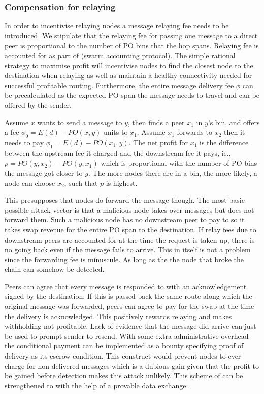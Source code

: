 \subsubsection{Compensation for relaying}

In order to incentivise relaying nodes a message relaying fee needs to be introduced.  We stipulate that the relaying fee for passing one message to a direct peer is proportional to the number of PO bins that the hop spans. Relaying fee is accounted for as part of  (swarm accounting protocol). The simple rational strategy to maximise profit will incentivise nodes to find the closest node to the destination when relaying as well as maintain a healthy connectivity needed for successful profitable routing. Furthermore, the entire message delivery fee $\phi$ can be precalculated as the expected PO span the message needs to travel and can be offered by the sender. 

Assume $x$ wants to send a message to $y$, then finds a peer $x_1$ in $y$'s bin, and offers a fee
$\phi_0 = E(d)-\mathit{PO}(x, y)$ units to $x_1$. Assume $x_1$ forwards to $x_2$ then it needs to pay $\phi_1=E(d)-\mathit{PO}(x_1, y)$. The net profit for $x_1$ is the difference between the upstream fee it charged and  the downstream fee it pays, ie., $p=\mathit{PO}(y, x_2)-\mathit{PO}(y, x_1)$ which is proportional with the number of PO bins the message got closer to $y$. The more nodes there are in a bin, the more likely, a node can choose $x_2$, such that  $p$ is highest.       

This presupposes that nodes do forward the message though. The most basic possible attack vector is that a malicious node takes over messages but does not forward them. Such a malicious node has no downstream peer to pay to so it takes swap revenue for the entire PO span to the destination. If relay fees due to downstream peers are accounted for at the time the request is taken up, there is no going back even if the message fails to arrive. This in itself is not a problem since the forwarding fee is minuscule. As long as the the node that broke the chain can somehow be detected. 

Peers can agree that every message is responded to with an acknowledgement signed by the destination. If
this is passed back the same route along which the original message was forwarded, peers can agree to pay for the swap at the time the delivery is acknowledged. This positively rewards relaying and makes withholding not profitable. 
Lack of evidence that the message did arrive can just be used to prompt sender to resend. With some extra administrative overhead the conditional payment can be implemented as a bounty specifying proof of delivery as its escrow condition. This construct would prevent nodes to ever charge for non-delivered messages which is a dubious gain given that the profit to be gained before detection makes this attack unlikely. 
This scheme of  can be strengthened to  with the help of a provable data exchange. 
 
